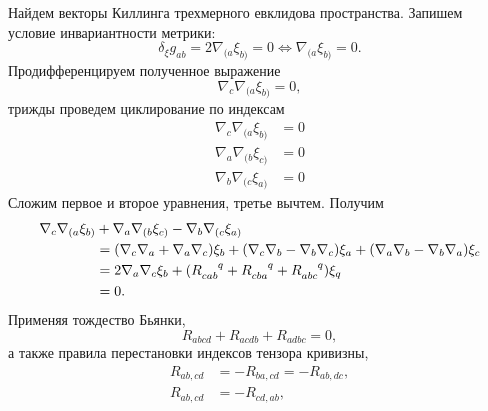 \documentclass[12pt,a4paper]{article}
\begin{document}
        Найдем векторы Киллинга трехмерного евклидова пространства. Запишем условие инвариантности метрики:
        \begin{equation}
            \delta_\xi g_{ab}
                = 2 \nabla_{(a} \xi_{b)}
                = 0
                \Leftrightarrow \nabla_{(a} \xi_{b)} = 0.
        \end{equation}
        Продифференцируем полученное выражение
        \begin{equation}
            \nabla_c \nabla_{(a} \xi_{b)} = 0,
        \end{equation}
        трижды проведем циклирование по индексам
        \begin{equation}\begin{aligned}
            \nabla_c \nabla_{(a} \xi_{b)} &= 0 \\
            \nabla_a \nabla_{(b} \xi_{c)} &= 0 \\
            \nabla_b \nabla_{(c} \xi_{a)} &= 0
        \end{aligned}\end{equation}
        Сложим первое и второе уравнения, третье вычтем. Получим
        \begin{equation}\begin{aligned}
            \nabla_c \nabla_{(a} \xi_{b)} &+
            \nabla_a \nabla_{(b} \xi_{c)} -
            \nabla_b \nabla_{(c} \xi_{a)} \\
                &=  \qty( \nabla_c \nabla_a + \nabla_a \nabla_c ) \xi_b +
                    \qty( \nabla_c \nabla_b - \nabla_b \nabla_c ) \xi_a +
                    \qty( \nabla_a \nabla_b - \nabla_b \nabla_a ) \xi_c \\
                &= 2 \nabla_a \nabla_c \xi_b + \qty(
                    R_{cab}^{\hphantom{cab}q} +
                    R_{cba}^{\hphantom{cba}q} +
                    R_{abc}^{\hphantom{abc}q}
                ) \xi_q \\
                &= 0 .
        \end{aligned}\end{equation}
        Применяя тождество Бьянки,
        \begin{equation}
            R_{abcd} + R_{acdb} + R_{adbc} = 0,
        \end{equation}
        а также правила перестановки индексов тензора кривизны,
        \begin{equation}\begin{aligned}
            R_{ab,cd} &= - R_{ba,cd} = - R_{ab,dc}, \\
            R_{ab,cd} &= - R_{cd,ab}, \\
        \end{aligned}\end{equation}
\end{document}
